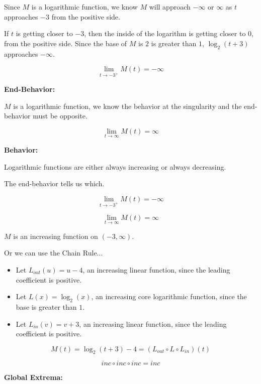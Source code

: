 \documentclass{ximera}
\begin{document}
\begin{formuala}
\begin{example}
Since $M$ is a logarithmic function, we know $M$ will approach $-\infty$ or $\infty$ as $t$ approaches $-3$ from the positive side. 

If $t$ is getting closer to $-3$, then the inside of the logarithm is getting closer to $0$, from the positive side.  Since the base of $M$ is $2$ is greater than $1$, $\log_2(t+3)$ approaches $-\infty$.


\[
\lim\limits_{t \to -3^+} M(t) = -\infty
\]



\textbf{End-Behavior:} 

$M$ is a logarithmic function, we know the behavior at the singularity and the end-behavior must be opposite.



\[
\lim\limits_{t \to \infty} M(t) = \infty
\]





\textbf{Behavior:} 

Logarithmic functions are either always increasing or always decreasing.

The end-behavior tells us which.

\[
\lim\limits_{t \to -3^+} M(t) = -\infty
\]

\[
\lim\limits_{t \to \infty} M(t) = \infty
\]



$M$ is an increasing function on $(-3, \infty)$.



Or we can use the Chain Rule...


\begin{itemize}
\item Let $L_{out}(u) = u - 4$, an increasing linear function, since the leading coefficient is positive.
\item Let $L(x) = \log_2(x)$, an increasing core logarithmic function, since the base is greater than $1$.
\item Let $L_{in}(v) = v + 3$, an increasing linear function, since the leading coefficient is positive.
\end{itemize}


\[ M(t) = \log_2(t+3) - 4 = (L_{out} \circ L \circ L_{in})(t)\]


\[ inc \circ inc \circ inc = inc  \]







\textbf{Global Extrema:} 


\end{example}
\end{formuala}
\end{document}
